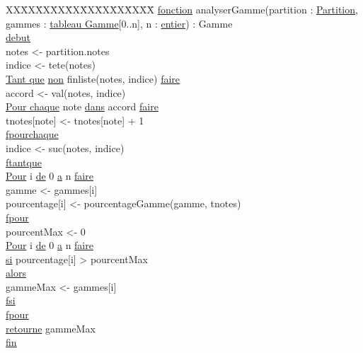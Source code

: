 \begin{tabbing}
\kill XX\=XX\=XX\=XX\=XX\=XX\=XX\=XX\=XX\=XX\=
\kill
\ul{fonction} analyserGamme(partition : \ul{Partition}, gammes : \ul{tableau Gamme}[0..n], n : \ul{entier}) : Gamme\\
\ul{debut}\\
    \>notes <- partition.notes\\
    \>indice <- tete(notes)\\
    \>\ul{Tant que} \ul{non} finliste(notes, indice) \ul{faire}\\
        \>\>accord <- val(notes, indice)\\
        \>\>\ul{Pour chaque} note \ul{dans} accord \ul{faire}\\
            \>\>\>tnotes[note] <- tnotes[note] + 1\\
        \>\>\ul{fpourchaque}\\
        indice <- suc(notes, indice)\\
    \>\ul{ftantque}\\

    \>\ul{Pour} i \ul{de} 0 \ul{a} n \ul{faire}\\
        \>\>gamme <- gammes[i]\\
        \>\>pourcentage[i] <- pourcentageGamme(gamme, tnotes)\\
    \>\ul{fpour}\\
    pourcentMax <- 0\\
    \>\ul{Pour} i \ul{de} 0 \ul{a} n \ul{faire}\\
        \>\>\ul{si} pourcentage[i] > pourcentMax\\
        \>\>\ul{alors}\\
            \>\>\>gammeMax <- gammes[i]\\
        \>\>\ul{fsi}\\
    \>\ul{fpour}\\

    \>\ul{retourne} gammeMax\\
\ul{fin}\\
\end{tabbing}

